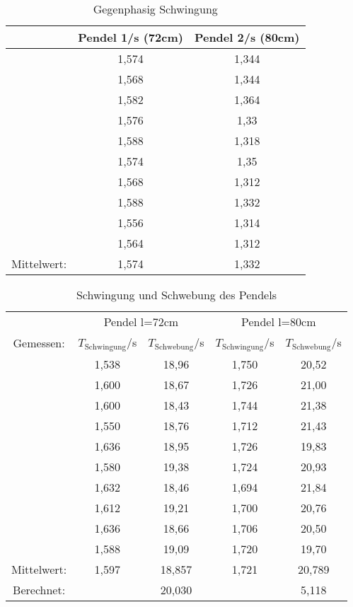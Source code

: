 \begin{table}
    \centering
    \label{tab:Data_gegenphasig}
    \caption{Gegenphasig Schwingung}
    \begin{tabular}{c c | c}
        \toprule
        & Pendel 1\;/\;s (72cm) & Pendel 2\;/\;s (80cm)\\
        \midrule
        & 1,574 & 1,344 \\
        & 1,568 & 1,344 \\
        & 1,582 & 1,364 \\
        & 1,576 & 1,33  \\
        & 1,588 & 1,318 \\
        & 1,574 & 1,35  \\
        & 1,568 & 1,312 \\
        & 1,588 & 1,332 \\
        & 1,556 & 1,314 \\
        & 1,564 & 1,312 \\
        \midrule
        Mittelwert: & 1,574 & 1,332 \\
        \bottomrule
    \end{tabular}
\end{table}

\begin{table}
    \centering
    \label{tab:Data_schw}
    \caption{Schwingung und Schwebung des Pendels}
    \begin{tabular}{c c | c || c | c}
        \toprule
        & \multicolumn{2}{c}{Pendel l=72cm} & \multicolumn{2}{c}{Pendel l=80cm} \\
        \cmidrule(lr){2-3}\cmidrule(lr){4-5}
        Gemessen: & $T_\text{Schwingung}$\;/\;s & $T_\text{Schwebung}$\;/\;s & $T_\text{Schwingung}$\;/\;s & $T_\text{Schwebung}$\;/\;s\\
        \midrule
        & 1,538 & 18,96 & 1,750 & 20,52 \\   
        & 1,600 & 18,67 & 1,726 & 21,00 \\
        & 1,600 & 18,43 & 1,744 & 21,38 \\
        & 1,550 & 18,76 & 1,712 & 21,43 \\
        & 1,636 & 18,95 & 1,726 & 19,83 \\
        & 1,580 & 19,38 & 1,724 & 20,93 \\
        & 1,632 & 18,46 & 1,694 & 21,84 \\
        & 1,612 & 19,21 & 1,700 & 20,76 \\
        & 1,636 & 18,66 & 1,706 & 20,50 \\
        & 1,588 & 19,09 & 1,720 & 19,70 \\
        \midrule
        Mittelwert: & 1,597 & 18,857 & 1,721 & 20,789 \\
        Berechnet:  &       & 20,030 &       &  5,118 \\
        \bottomrule
    \end{tabular}
\end{table}

